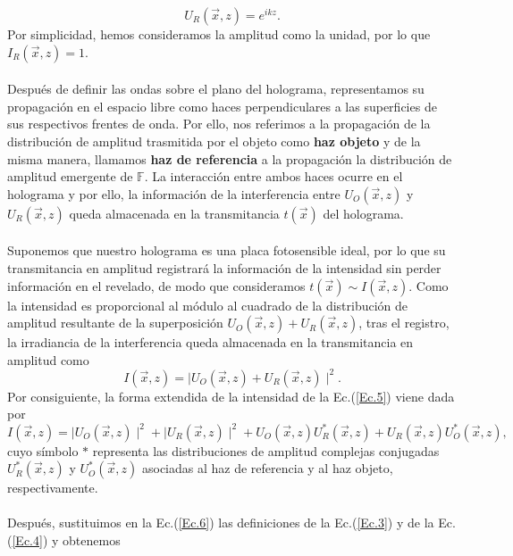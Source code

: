 \documentclass[12pt]{article}
\begin{document}
\begin{equation}
    U_R (\vec{x}, z) = e^{i k z}.
    \label{Ec.4}
\end{equation}
Por simplicidad, hemos consideramos  la amplitud como la unidad, por lo que $I_R(\Vec{x}, z) = 1$. \\ \\
Después de definir  las ondas sobre el plano del holograma, representamos su propagación  en el espacio libre como haces perpendiculares a las superficies  de sus respectivos  frentes de onda. Por ello, nos referimos  a la propagación de la distribución de amplitud trasmitida por el objeto como \textbf{haz objeto} y de la misma manera, llamamos \textbf{haz de referencia} a la propagación la distribución de amplitud emergente de $\mathbb{F}$. La interacción entre ambos haces  ocurre en el holograma y por ello, la información de la interferencia entre  $U_O (\Vec{x}, z)$ y $U_R (\Vec{x}, z)$ queda almacenada  en la transmitancia $t(\Vec{x})$  del holograma. \\ \\
Suponemos que nuestro  holograma es una placa fotosensible ideal, por lo que su transmitancia en amplitud registrará la información de la intensidad sin perder información en el revelado, de modo que consideramos  $t(\Vec{x}) \sim  I (\Vec{x}, z)$. Como la intensidad  es proporcional al módulo al cuadrado de la distribución de amplitud resultante de la  superposición  $U_O (\Vec{x}, z) + U_R (\Vec{x}, z)$, tras el registro,  la irradiancia  de la interferencia  queda almacenada en la transmitancia en amplitud como 
\begin{equation}
     I (\Vec{x}, z) =  \mid  U_O (\Vec{x}, z) + U_R (\Vec{x}, z) \mid  ^{ 2 }.
     \label{Ec.5}
\end{equation}
Por consiguiente,  la forma extendida de la intensidad de la Ec.(\ref{Ec.5}) viene dada por
\begin{equation}
      I (\Vec{x}, z) =  \mid  U_O (\Vec{x}, z) \mid ^{2} +  \mid U_R (\Vec{x}, z) \mid ^{2} + U_O (\Vec{x}, z) U_R^{*} (\Vec{x}, z) + U_R (\Vec{x}, z) U_O^{*} (\Vec{x}, z),
    \label{Ec.6}
\end{equation}
cuyo símbolo $\ast$ representa las distribuciones de amplitud complejas conjugadas $U_R^{*}(\Vec{x}, z)$ y $U_O^{*} (\Vec{x}, z)$  asociadas al haz de referencia y al haz objeto, respectivamente. \\ \\
Después, sustituimos  en la Ec.(\ref{Ec.6}) las definiciones de la Ec.(\ref{Ec.3}) y de la Ec.(\ref{Ec.4}) y obtenemos
\end{document}
